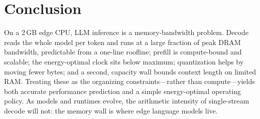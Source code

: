 \documentclass[10pt,journal,compsoc]{IEEEtran}
\begin{document}


\section{Conclusion}\label{sec:conclusion}
On a 2\,GB edge CPU, LLM inference is a memory-bandwidth problem. Decode reads the whole model per
token and runs at a large fraction of peak DRAM bandwidth, predictable from a one-line roofline;
prefill is compute-bound and scalable; the energy-optimal clock sits below maximum; quantization
helps by moving fewer bytes; and a second, capacity wall bounds context length on limited RAM.
Treating these as the organizing constraints---rather than compute---yields both accurate
performance prediction and a simple energy-optimal operating policy. As models and runtimes evolve,
the arithmetic intensity of single-stream decode will not: the memory wall is where edge language
models live.



\end{document}

